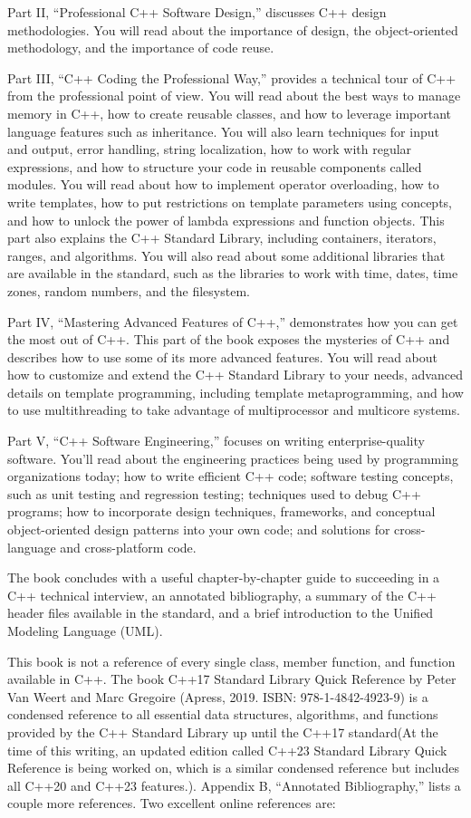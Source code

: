 Part II, “Professional C++ Software Design,” discusses C++ design methodologies. You will read about the importance of design, the object-oriented methodology, and the importance of code reuse.

Part III, “C++ Coding the Professional Way,” provides a technical tour of C++ from the professional point of view. You will read about the best ways to manage memory in C++, how to create reusable classes, and how to leverage important language features such as inheritance. You will also learn techniques for input and output, error handling, string localization, how to work with regular expressions, and how to structure your code in reusable components called modules. You will read about how to implement operator overloading, how to write templates, how to put restrictions on template parameters using concepts, and how to unlock the power of lambda expressions and function objects. This part also explains the C++ Standard Library, including containers, iterators, ranges, and algorithms. You will also read about some additional libraries that are available in the standard, such as the libraries to work with time, dates, time zones, random numbers, and the filesystem.

Part IV, “Mastering Advanced Features of C++,” demonstrates how you can get the most out of C++. This part of the book exposes the mysteries of C++ and describes how to use some of its more advanced features. You will read about how to customize and extend the C++ Standard Library to your needs, advanced details on template programming, including template metaprogramming, and how to use multithreading to take advantage of multiprocessor and multicore systems.

Part V, “C++ Software Engineering,” focuses on writing enterprise-quality software. You’ll read about the engineering practices being used by programming organizations today; how to write efficient C++ code; software testing concepts, such as unit testing and regression testing; techniques used to debug C++ programs; how to incorporate design techniques, frameworks, and conceptual object-oriented design patterns into your own code; and solutions for cross-language and cross-platform code.

The book concludes with a useful chapter-by-chapter guide to succeeding in a C++ technical interview, an annotated bibliography, a summary of the C++ header files available in the standard, and a brief introduction to the Unified Modeling Language (UML).

This book is not a reference of every single class, member function, and function available in C++. The book C++17 Standard Library Quick Reference by Peter Van Weert and Marc Gregoire (Apress, 2019. ISBN: 978-1-4842-4923-9) is a condensed reference to all essential data structures, algorithms, and functions provided by the C++ Standard Library up until the C++17 standard(At the time of this writing, an updated edition called C++23 Standard Library Quick Reference is being worked on, which is a similar condensed reference but includes all C++20 and C++23 features.). Appendix B, “Annotated Bibliography,” lists a couple more references. Two excellent online references are:

